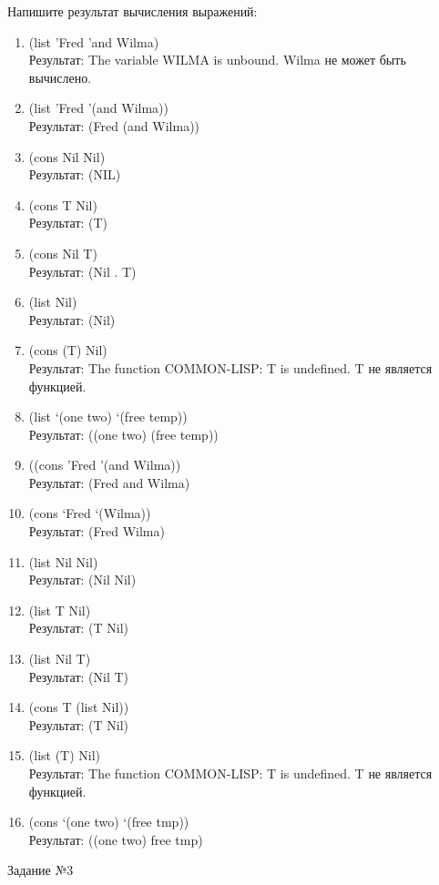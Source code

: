 Напишите результат вычисления выражений:
\begin{enumerate}
\item (list 'Fred 'and Wilma)\\
Результат: The variable WILMA is unbound. Wilma не может быть вычислено.
\item (list 'Fred '(and Wilma))\\
Результат: (Fred (and Wilma))
\item (cons Nil Nil)\\
Результат: (NIL)
\item (cons T Nil)\\
Результат: (T)
\item (cons Nil T)\\
Результат: (Nil . T)
\item (list Nil)\\
Результат: (Nil)
\item (cons (T) Nil)\\
Результат: The function COMMON-LISP: T is undefined. T не является функцией.
\item (list ‘(one two) ‘(free temp))\\
Результат: ((one two) (free temp))
\item ((cons 'Fred '(and Wilma))\\
Результат: (Fred and Wilma)
\item (cons ‘Fred ‘(Wilma))\\
Результат: (Fred Wilma)
\item (list Nil Nil)\\
Результат: (Nil Nil)
\item (list T Nil)\\
Результат: (T Nil)
\item (list Nil T)\\
Результат: (Nil T)
\item (cons T (list Nil))\\
Результат: (T Nil)
\item (list (T) Nil)\\
Результат: The function COMMON-LISP: T is undefined. T не является функцией.
\item (cons ‘(one two) ‘(free tmp))\\
Результат: ((one two) free tmp)\\
\end{enumerate}


{\LARGE Задание №3}\\

